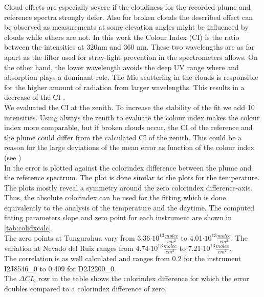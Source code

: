 Cloud effects are especially severe if the cloudiness for the recorded plume and reference spectra strongly defer. Also for broken clouds the described effect can be observed as measurements at some elevation angles might be influenced by clouds while others are not.
In this work the Colour Index (CI) is the ratio between the intensities at 320nm and 360 nm.
These two wavelengths are as far apart as the filter used for stray-light prevention in the spectrometers allows.
On the other hand, the lower wavelength avoids the deep UV range where  and   absorption plays a dominant role.
The Mie scattering in the clouds is responsible for the higher amount of radiation from larger wavelengths. This results in a decrease of the CI \citep{lubcke2014optical}.\\
We evaluated the CI at the zenith. To increase the stability of the fit we add 10 intensities. Using always the zenith to evaluate the colour index makes the colour index more comparable, but if broken clouds occur, the CI of the reference and the plume could differ from the calculated CI of the zenith. This could be a reason for the large deviations of the mean  error as function of the colour index (see )\\
In  the  error is plotted against the colorindex difference between the plume and the reference spectrum. The plot is done similar to the plots for the temperature.
The plots mostly reveal a symmetry around the zero colorindex difference-axis. Thus, the absolute colorindex can be used for the fitting which is done equivalently to the analysis of the temperature and the daytime. The computed fitting parameters slope and zero point for each instrument are shown in \cref{tab:colidxcalc}. \\
The zero points at Tungurahua vary from 3.36$\cdot10^{13}\frac{molec}{cm^2}$ to 4.01$\cdot10^{13}\frac{molec}{cm^2}$. The variation at Nevado del Ruiz ranges from  4.74$\cdot10^{13}\frac{molec}{cm^2}$ to 7.21$\cdot10^{13}\frac{molec}{cm^2}$.\\
The correlation is as well calculated and ranges from 0.2 for the instrument I2J8546\_0 to  0.409 for D2J2200\_0.\\
The $\Delta CI_{2}$ row in the table shows the colorindex difference for which the error doubles compared to a colorindex difference of zero.
